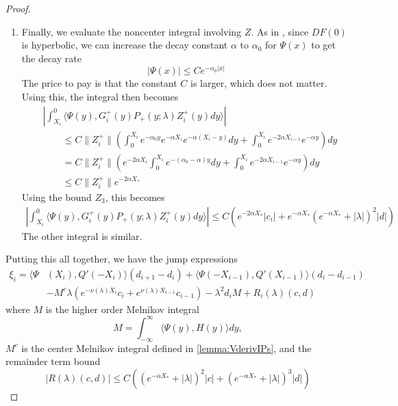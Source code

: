 \documentclass[thesis.tex]{subfiles}
\begin{document}
\begin{lemma}
\begin{proof}
\begin{enumerate}
\item Finally, we evaluate the noncenter integral involving $Z$. As in \cite[p. 448]{Sandstede1998}, since $DF(0)$ is hyperbolic, we can increase the decay constant $\alpha$ to $\alpha_0$ for $\Psi(x)$ to get the decay rate
\[
|\Psi(x)| \leq C e^{-\alpha_0 |x|}
\]
The price to pay is that the constant $C$ is larger, which does not matter. Using this, the integral then becomes
\begin{align*}
&\left| \int_{X_i}^0 \langle \Psi(y), G_i^+(y) P_+(y; \lambda) Z_i^+(y) dy \rangle \right| \\
&\qquad \leq C \| Z_i^+\|  \left( \int_0^{X_i} e^{-\alpha_0 y} e^{-\alpha X_i} e^{-\alpha(X_i - y)} dy + \int_0^{X_i} e^{-2 \alpha X_{i-1}} e^{-\alpha y} \right) dy \\
&\qquad =C \| Z_i^+\|  \left( e^{-2 \alpha X_i} \int_0^{X_i} e^{-(\alpha_0 - \alpha) y} dy + \int_0^{X_i} e^{-2 \alpha X_{i-1}} e^{-\alpha y} \right) dy \\
&\qquad \leq C \| Z_i^+\| e^{-2 \alpha X_*}
\end{align*}
Using the bound $Z_3$, this becomes
\begin{align*}
\left| \int_{X_i}^0 \langle \Psi(y), G_i^+(y) P_+(y; \lambda) Z_i^+(y) dy \rangle \right|\leq C \left( e^{-2 \alpha X_* } |c_i| + e^{-\alpha X_* }(e^{-\alpha X_*} + |\lambda|)^2 |d| \right)
\end{align*}
The other integral is similar.
\end{enumerate}

Putting this all together, we have the jump expressions
\begin{align*}
\xi_i = \langle \Psi&(X_i), Q'(-X_i) \rangle (d_{i+1} - d_i ) + \langle \Psi(-X_{i-1}), Q'(X_{i-1}) \rangle (d_i - d_{i-1} ) \\
&- M^c \lambda( e^{-\nu(\lambda)X_i}c_i + e^{\nu(\lambda)X_{i-1}}c_{i-1})
- \lambda^2 d_i M + R_i(\lambda)(c, d)
\end{align*}
where $M$ is the higher order Melnikov integral
\[
M = \int_{-\infty}^\infty \langle \Psi(y), H(y) \rangle dy,
\]
$M^c$ is the center Melnikov integral defined in \cref{lemma:VderivIPs}, and the remainder term bound
\begin{equation}\label{noncenterR}
|R(\lambda)(c, d)| \leq C \left( (e^{-\alpha X_*} + |\lambda|)^2 |c| + (e^{-\alpha X_*} + |\lambda|)^3 |d| \right)
\end{equation}


\end{proof}
\end{lemma}
\end{document}
